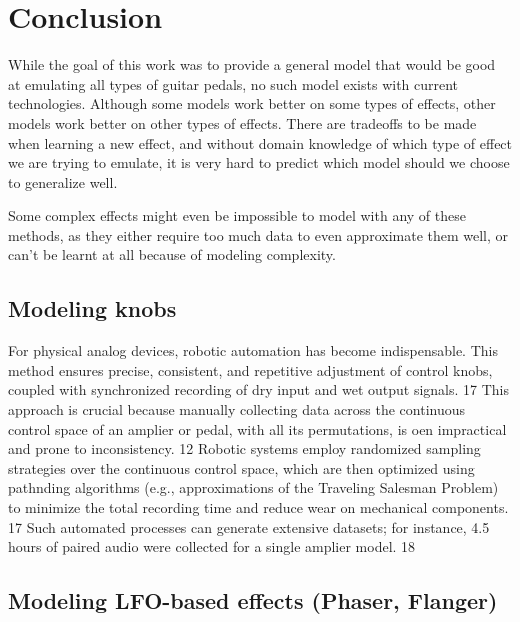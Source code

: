 \documentclass[masterthesis]{fer}
\begin{document}
\chapter{Conclusion}
\label{chp:conclusion}

While the goal of this work was to provide a general model that would be good at emulating all types of guitar pedals, no such model exists with current technologies. Although some models work better on some types of effects, other models work better on other types of effects. There are tradeoffs to be made when learning a new effect, and without domain knowledge of which type of effect we are trying to emulate, it is very hard to predict which model should we choose to generalize well. 

Some complex effects might even be impossible to model with any of these methods, as they either require too much data to even approximate them well, or can't be learnt at all because of modeling complexity.


\section{Modeling knobs}

For physical analog devices, robotic automation has become indispensable. This
method ensures precise, consistent, and repetitive adjustment of control knobs,
coupled with synchronized recording of dry input and wet output signals.
17 This
approach is crucial because manually collecting data across the continuous control
space of an amplier or pedal, with all its permutations, is oen impractical and prone
to inconsistency.
12 Robotic systems employ randomized sampling strategies over the
continuous control space, which are then optimized using pathnding algorithms
(e.g., approximations of the Traveling Salesman Problem) to minimize the total
recording time and reduce wear on mechanical components.
17 Such automated
processes can generate extensive datasets; for instance, 4.5 hours of paired audio
were collected for a single amplier model.
18

\section{Modeling LFO-based effects (Phaser, Flanger)}
\end{document}
